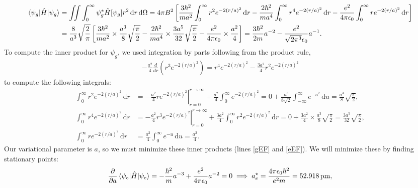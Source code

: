 \documentclass[10pt]{article}
\newcommand{\1}{\mathbf 1}
\begin{document}
\begin{align}
	\braket{\psi_g | \hat H | \psi_g}
	&=
	\iint \int_0^\infty \psi_g^\ast \hat H[\psi_g] r^2 \,\mathrm{d}r \,\mathrm{d}\Omega
	=
	4\pi B^2
	\left[
		\frac{3 \hbar^2}{m a^2}
		\int_0^\infty r^2 e^{-2(r/a)^2} \,\mathrm{d}r
		-
		\frac{2 \hbar^2}{m a^4}
		\int_0^\infty r^4 e^{-2(r/a)^2} \,\mathrm{d}r
		-
		\frac{e^2}{4 \pi \epsilon_0}
		\int_0^\infty r e^{-2(r/a)^2} \,\mathrm{d}r
		\right]
	\nonumber
	\\
	&=\label{gEF}
	\frac{8}{a^3} \sqrt{\frac{2}{\pi}}
	\left[
		\frac{3 \hbar^2}{m a^2}
	\times
			\frac{a^3}{8} \sqrt{\frac{\pi}{2}}
		-
		\frac{2 \hbar^2}{m a^4}
		\times
		\frac{3a^5}{32} \sqrt{\frac{\pi}{2}}
		-
		\frac{e^2}{4 \pi \epsilon_0}
		\times
		\frac{a^2}{4}
		\right]
		=
		\frac{3\hbar^2}{2m}a^{-2}
		-
		\frac{e^2}{\sqrt{2\pi^3}\epsilon_0} a^{-1}.
\end{align}
To compute the inner product for $\psi_g$, we used integration by parts following from the product rule,
\begin{align}
	-\frac{a^2}{4}
	\frac{d}{dr} (r^3 e^{-2(r/a)^2})
	=
	r^4e^{-2(r/a)^2}
	-
	\frac{3a^2}{4}r^2e^{-2(r/a)^2}
\end{align}
to compute the following integrals:
\begin{align}
	\int_0^\infty r^2 e^{-2(r/a)^2} \,\mathrm{d}r
	&=
	\left.-\frac{a^2}{4}
	r e^{-2(r/a)^2}
	\right|_{r=0}^{r \to \infty}
	+
	\frac{a^2}{4}
	\int_0^\infty e^{-2(r/a)^2}
	=
	0
	+
	\frac{a^3}{8\sqrt{2}}
	\int_{-\infty}^\infty e^{-u^2} \,\mathrm{d}u
	=
	\frac{a^3}{8}\sqrt{\frac{\pi}{2}},
	\\
	\int_0^\infty r^4 e^{-2(r/a)^2}
	\,\mathrm{d}r
	&=
	\left.-\frac{a^2}{4}
	r^3 e^{-2(r/a)^2}
	\right|_{r=0}^{r\to\infty}
	+
	\frac{3a^2}{4}
	\int_0^\infty r^2 e^{-2(r/a)^2}\,\mathrm{d}r
	=
	0
	+
	\frac{3a^2}{4}
	\times \frac{a^3}{8}
	\sqrt{\frac{\pi}{2}}
	=
	\frac{3a^5}{32}\sqrt{\frac{\pi}{2}},
	\\
	\int_0^\infty r e^{-2(r/a)^2}\,\mathrm{d}r
	&=
	\frac{a^2}{4}
	\int_0^\infty e^{-u}\,\mathrm{d}u
	=
	\frac{a^2}{4}.
\end{align}
Our variational parameter is $a$, so we must minimize these inner products (lines \ref{gEF} and \ref{eEF}).
We will minimize these by finding stationary points:
\begin{align}
	\frac{\partial}{\partial a}
	\braket{\psi_e | \hat H |\psi_e}
	=
	-\frac{\hbar^2}{m}a^{-3}
	+
	\frac{e^2}{4\pi \epsilon_0}a^{-2}
	=
	0
	\implies
	a_e^\star
	=
	\frac{4 \pi \epsilon_0\hbar^2 }{e^2m }
	=
	\SI{52.918}{\pico\metre}
	,
\end{align}
\end{document}
